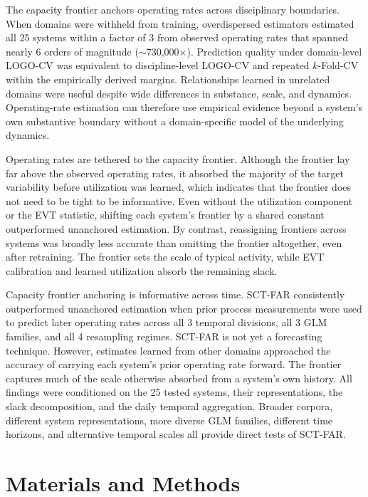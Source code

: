 \documentclass{article}
\begin{document}
The capacity frontier anchors operating rates across disciplinary boundaries. When domains were withheld from training, overdispersed estimators estimated all 25 systems within a factor of 3 from observed operating rates that spanned nearly 6 orders of magnitude (${\sim}$730,000$\times$). Prediction quality under domain-level LOGO-CV was equivalent to discipline-level LOGO-CV and repeated $k$-Fold-CV within the empirically derived margins. Relationships learned in unrelated domains were useful despite wide differences in substance, scale, and dynamics. Operating-rate estimation can therefore use empirical evidence beyond a system's own substantive boundary without a domain-specific model of the underlying dynamics.

Operating rates are tethered to the capacity frontier. Although the frontier lay far above the observed operating rates, it absorbed the majority of the target variability before utilization was learned, which indicates that the frontier does not need to be tight to be informative. Even without the utilization component or the EVT statistic, shifting each system's frontier by a shared constant outperformed unanchored estimation. By contrast, reassigning frontiers across systems was broadly less accurate than omitting the frontier altogether, even after retraining. The frontier sets the scale of typical activity, while EVT calibration and learned utilization absorb the remaining slack.

Capacity frontier anchoring is informative across time. SCT-FAR consistently outperformed unanchored estimation when prior process measurements were used to predict later operating rates across all 3 temporal divisions, all 3 GLM families, and all 4 resampling regimes. SCT-FAR is not yet a forecasting technique. However, estimates learned from other domains approached the accuracy of carrying each system's prior operating rate forward. The frontier captures much of the scale otherwise absorbed from a system's own history. All findings were conditioned on the 25 tested systems, their representations, the slack decomposition, and the daily temporal aggregation. Broader corpora, different system representations, more diverse GLM families, different time horizons, and alternative temporal scales all provide direct tests of SCT-FAR.

\section*{Materials and Methods}
\label{sec:methods}
\end{document}
